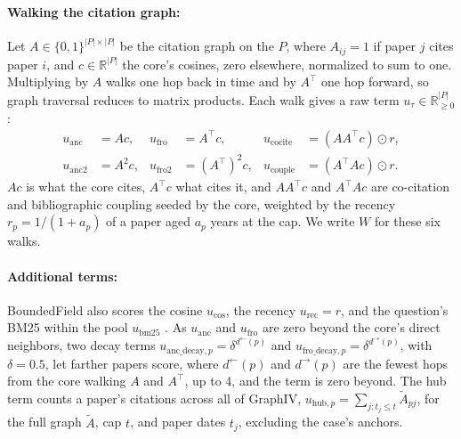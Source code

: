 \paragraph{Walking the citation graph:}
Let $A \in \{0,1\}^{|P| \times |P|}$ be the citation graph on the  $P$, where $A_{ij} = 1$ if paper $j$ cites paper $i$, and $c\in\mathbb{R}^{|P|}$ the core's cosines, zero elsewhere, normalized to sum to one. Multiplying by $A$ walks one hop back in time and by $A^\top$ one hop forward, so graph traversal reduces to matrix products. Each walk gives a raw term $u_\tau \in \mathbb{R}_{\geq 0}^{|P|}$:
\begin{equation}
    \label{eq:walks}
    \begin{aligned}
        u_{\text{anc}} &= A c, & u_{\text{fro}} &= A^\top c, & u_{\text{cocite}} &= (A A^\top c) \odot r, \\
        u_{\text{anc2}} &= A^2 c, & u_{\text{fro2}} &= (A^\top)^2 c, & u_{\text{couple}} &= (A^\top A c) \odot r.
    \end{aligned}
\end{equation}
$Ac$ is what the core cites, $A^\top c$ what cites it, and $AA^\top c$ and $A^\top A c$ are co-citation \citep{small1973cocitation} and bibliographic coupling \citep{kessler1963coupling} seeded by the core, weighted by the recency $r_p = 1/(1+a_p)$ of a paper aged $a_p$ years at the cap. We write $W$ for these six walks.

\paragraph{Additional terms:}
BoundedField also scores the cosine $u_{\text{cos}}$, the recency $u_{\text{rec}} = r$, and the question's BM25 within the pool $u_{\text{bm25}}$ \citep{robertson2009bm25}. As $u_{\text{anc}}$ and $u_{\text{fro}}$ are zero beyond the core's direct neighbors, two decay terms $u_{\text{anc\_decay},p} = \delta^{d^{\leftarrow}(p)}$ and $u_{\text{fro\_decay},p} = \delta^{d^{\rightarrow}(p)}$, with $\delta = 0.5$, let farther papers score, where $d^{\leftarrow}(p)$ and $d^{\rightarrow}(p)$ are the fewest hops from the core walking $A$ and $A^\top$, up to 4, and the term is zero beyond. The hub term counts a paper's citations across all of GraphIV, $u_{\text{hub},p} = \sum_{j : t_j \leq t} \tilde{A}_{pj}$, for the full graph $\tilde{A}$, cap $t$, and paper dates $t_j$, excluding the case's anchors.

